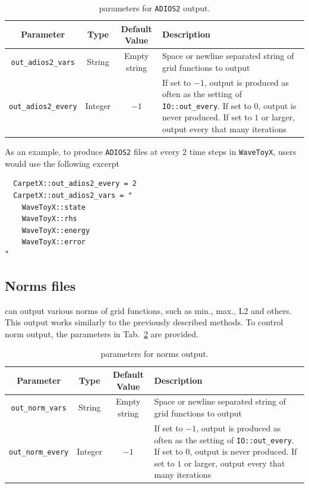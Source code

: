 \begin{table}[ht]
  \centering
  \begin{tabular*}{\textwidth}{cccp{23em}}
    Parameter                 & Type    & Default Value  & Description \\\hline\hline
    \texttt{out\_adios2\_vars}  & String  & Empty string   & Space or newline separated string of grid functions to output \\
    \texttt{out\_adios2\_every} & Integer & $-1$           & If set to $-1$, output is produced as often as the setting of \texttt{IO::out\_every}. If set to $0$, output is never produced. If set to $1$ or larger, output every that many iterations \\\hline\hline
  \end{tabular*}
  \label{tab:adios2_params}
  \caption{\CarpetX\space parameters for \texttt{ADIOS2} output.}
\end{table}

As an example, to produce \texttt{ADIOS2} files at every $2$ time steps in \texttt{WaveToyX}, users would use the following excerpt

\begin{verbatim}
  CarpetX::out_adios2_every = 2
  CarpetX::out_adios2_vars = "
    WaveToyX::state
    WaveToyX::rhs
    WaveToyX::energy
    WaveToyX::error
"
\end{verbatim}

\subsection{Norms files}

\CarpetX can output various norms of grid functions, such as min., max., L2 and others. This output works similarly to the previously described methods. To control norm output, the parameters in Tab.~\ref{tab:norms_output} are provided.

\begin{table}[hb]
  \centering
  \begin{tabular*}{\textwidth}{cccp{23em}}
    Parameter                 & Type    & Default Value  & Description \\\hline\hline
    \texttt{out\_norm\_vars}  & String  & Empty string   & Space or newline separated string of grid functions to output \\
    \texttt{out\_norm\_every} & Integer & $-1$           & If set to $-1$, output is produced as often as the setting of \texttt{IO::out\_every}. If set to $0$, output is never produced. If set to $1$ or larger, output every that many iterations \\\hline\hline
  \end{tabular*}
  \label{tab:norms_output}
  \caption{\CarpetX\space parameters for norms output.}
\end{table}


